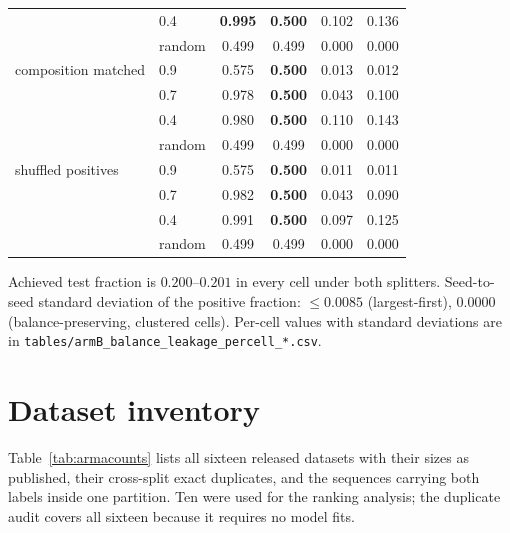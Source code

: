 \documentclass[11pt,a4paper]{article}
\begin{document}
\begin{table}[htbp]
\begin{tabular}{llcccc}
                    & 0.4    & \textbf{0.995} & \textbf{0.500} & 0.102 & 0.136 \\
                    & random & 0.499 & 0.499 & 0.000 & 0.000 \\
\addlinespace
composition matched & 0.9    & 0.575 & \textbf{0.500} & 0.013 & 0.012 \\
                    & 0.7    & 0.978 & \textbf{0.500} & 0.043 & 0.100 \\
                    & 0.4    & 0.980 & \textbf{0.500} & 0.110 & 0.143 \\
                    & random & 0.499 & 0.499 & 0.000 & 0.000 \\
\addlinespace
shuffled positives  & 0.9    & 0.575 & \textbf{0.500} & 0.011 & 0.011 \\
                    & 0.7    & 0.982 & \textbf{0.500} & 0.043 & 0.090 \\
                    & 0.4    & 0.991 & \textbf{0.500} & 0.097 & 0.125 \\
                    & random & 0.499 & 0.499 & 0.000 & 0.000 \\
\bottomrule
\end{tabular}

\vspace{3pt}
\footnotesize\raggedright
Achieved test fraction is $0.200$--$0.201$ in every cell under both splitters. Seed-to-seed
standard deviation of the positive fraction: $\leq 0.0085$ (largest-first), $0.0000$
(balance-preserving, clustered cells). Per-cell values with standard deviations are in
\texttt{tables/armB\_balance\_leakage\_percell\_*.csv}.
\end{table}

\section{Dataset inventory}

Table~\ref{tab:armacounts} lists all sixteen released datasets with their sizes
as published, their cross-split exact duplicates, and the sequences carrying both
labels inside one partition. Ten were used for the ranking analysis; the
duplicate audit covers all sixteen because it requires no model fits.
\end{document}
